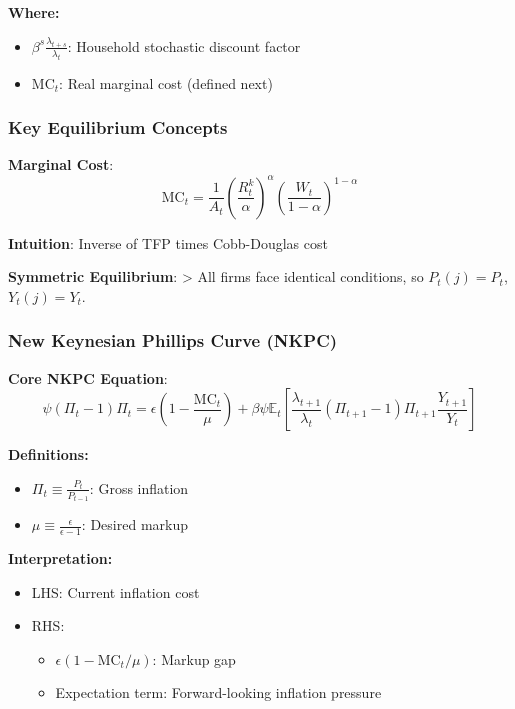 \documentclass[11pt,preprint]{elsarticle}
\numberwithin{equation}{section}
\numberwithin{figure}{section}
\numberwithin{table}{section}
\def\tightlist{} %
\begin{document}
\textbf{Where:}

\begin{itemize}
\tightlist
\item
  \(\beta^s \frac{\lambda_{t+s}}{\lambda_t}\): Household stochastic
  discount factor
\item
  \(\text{MC}_t\): Real marginal cost (defined next)
\end{itemize}

\subsubsection{Key Equilibrium Concepts}\label{key-equilibrium-concepts}

\textbf{Marginal Cost}: \[
\text{MC}_t = \frac{1}{A_t} \left( \frac{R_t^k}{\alpha} \right)^\alpha \left( \frac{W_t}{1 - \alpha} \right)^{1 - \alpha}
\]

\textbf{Intuition}: Inverse of TFP times Cobb-Douglas cost

\textbf{Symmetric Equilibrium}: \textgreater{} All firms face identical
conditions, so \(P_t(j) = P_t\), \(Y_t(j) = Y_t\).

\subsubsection{New Keynesian Phillips Curve
(NKPC)}\label{new-keynesian-phillips-curve-nkpc}

\textbf{Core NKPC Equation}: \[
\psi (\Pi_t - 1) \Pi_t = \epsilon \left( 1 - \frac{\text{MC}_t}{\mu} \right) + 
\beta \psi \mathbb{E}_t \left[ \frac{\lambda_{t+1}}{\lambda_t} (\Pi_{t+1} - 1) \Pi_{t+1} \frac{Y_{t+1}}{Y_t} \right]
\]

\textbf{Definitions:}

\begin{itemize}
\tightlist
\item
  \(\Pi_t \equiv \frac{P_t}{P_{t-1}}\): Gross inflation
\item
  \(\mu \equiv \frac{\epsilon}{\epsilon - 1}\): Desired markup
\end{itemize}

\textbf{Interpretation:}

\begin{itemize}
\tightlist
\item
  LHS: Current inflation cost\\
\item
  RHS:

  \begin{itemize}
  \tightlist
  \item
    \(\epsilon (1 - \text{MC}_t / \mu)\): Markup gap\\
  \item
    Expectation term: Forward-looking inflation pressure
  \end{itemize}
\end{itemize}
\end{document}
